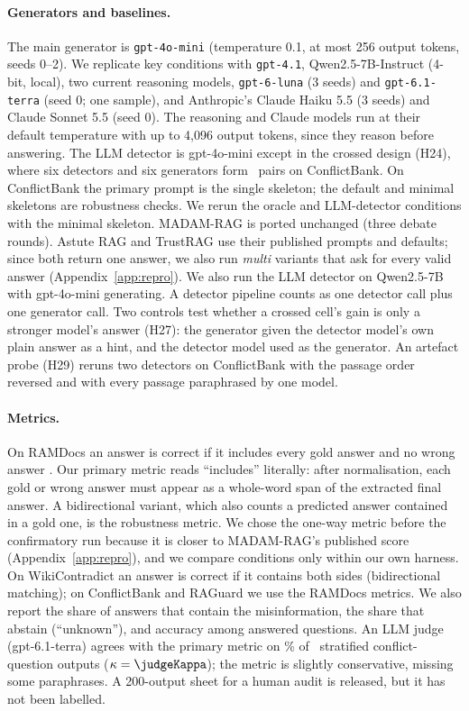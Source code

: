 \paragraph{Generators and baselines.}
The main generator is \texttt{gpt-4o-mini} \citep{openai2024gpt4o} (temperature 0.1, at most 256 output tokens, seeds
0--2). We replicate key conditions with \texttt{gpt-4.1}, Qwen2.5-7B-Instruct \citep{yang2024qwen25} (4-bit, local),
two current reasoning models, \texttt{gpt-6-luna} (3 seeds) and \texttt{gpt-6.1-terra} (seed 0; one sample), and Anthropic's
Claude Haiku 5.5 (3 seeds) and Claude Sonnet 5.5 (seed 0). The reasoning and Claude models run at their default
temperature with up to 4,096 output tokens, since they reason before answering. The LLM detector is gpt-4o-mini
except in the crossed design (H24), where six detectors and six generators form \hTwentyFourCells\ pairs on ConflictBank. On ConflictBank the primary prompt is the single skeleton; the default and
minimal skeletons are robustness checks. We rerun the oracle and LLM-detector conditions with the minimal skeleton.
MADAM-RAG \citep{wang2025madam} is ported unchanged (three debate rounds). Astute RAG \citep{wang2025astute} and
TrustRAG \citep{zhou2025trustrag} use their published prompts and defaults; since both return one answer, we also run
\emph{multi} variants that ask for every valid answer (Appendix~\ref{app:repro}). We also run the LLM detector on
Qwen2.5-7B with gpt-4o-mini generating. A detector pipeline counts as one detector call plus one generator call. Two
controls test whether a crossed cell's gain is only a stronger model's answer (H27): the generator given the detector
model's own plain answer as a hint, and the detector model used as the generator. An artefact probe (H29) reruns two
detectors on ConflictBank with the passage order reversed and with every passage paraphrased by one model.

\paragraph{Metrics.}
On RAMDocs an answer is correct if it includes every gold answer and no wrong answer \citep{wang2025madam}. Our primary
metric reads ``includes'' literally: after normalisation, each gold or wrong answer must appear as a whole-word span
of the extracted final answer. A bidirectional variant, which also counts a predicted answer contained in a gold one,
is the robustness metric. We chose the one-way metric before the confirmatory run because it is closer to MADAM-RAG's
published score (Appendix~\ref{app:repro}), and we compare conditions only within our own harness. On WikiContradict
an answer is correct if it contains both sides (bidirectional matching); on ConflictBank and RAGuard we use the RAMDocs metrics. We also report
the share of answers that contain the misinformation, the share that abstain (``unknown''), and accuracy among answered
questions. An LLM judge (gpt-6.1-terra) agrees with the primary metric on \judgeAgree\% of \judgeN\ stratified
conflict-question outputs ($\kappa=\judgeKappa$); the metric is slightly conservative, missing some paraphrases. A
200-output sheet for a human audit is released, but it has not been labelled.


